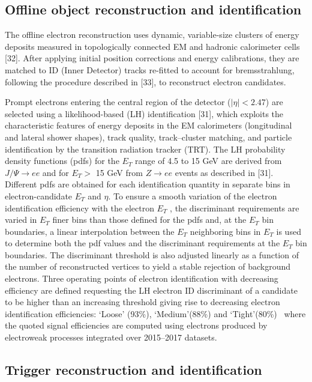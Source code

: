 \subsection{Offline object reconstruction and identification}\label{subsec:electron_offline}

The offline electron reconstruction uses dynamic, variable-size clusters of energy deposits measured in topologically connected EM and hadronic calorimeter cells [32]. After applying initial position corrections and energy calibrations, they are matched to ID (Inner Detector) tracks re-fitted to account for bremsstrahlung, following the procedure described in [33], to reconstruct electron candidates. 

Prompt electrons entering the central region of the detector ($|\eta|<2.47$) are selected using a likelihood-based (LH) identification [31], which exploits the characteristic features of energy deposits in the EM calorimeters (longitudinal and lateral shower shapes), track quality, track–cluster matching, and particle identification by the transition radiation tracker (TRT). The LH probability density functions (pdfs) for the $E_T$ range of 4.5 to 15 GeV are derived from $J/\Psi\rightarrow ee$ and for $E_T >$ 15 GeV from $Z\rightarrow ee$ events as described in [31]. Different pdfs are obtained for each identification quantity in separate bins in electron-candidate $E_T$ and $\eta$. To ensure a smooth variation of the electron identification efficiency with the electron $E_T$ , the discriminant requirements are varied in $E_T$ finer bins than those defined for the pdfs and, at the $E_T$ bin boundaries, a linear interpolation between the $E_T$ neighboring bins in $E_T$ is used to determine both the pdf values and the discriminant requirements at the $E_T$ bin boundaries. The discriminant threshold is also adjusted linearly as a function of the number of reconstructed vertices to yield a stable rejection of background electrons. Three operating points of electron identification with decreasing efficiency are defined requesting the LH electron ID discriminant of a candidate to be higher than an increasing threshold giving rise to decreasing electron identification efficiencies: ‘Loose’ (93\%), ‘Medium’(88\%) and ‘Tight’(80\%)~\cite{TRIG-2018-01} where the quoted signal efficiencies are computed using electrons produced by electroweak processes integrated over 2015–2017 datasets.

\subsection{Trigger reconstruction and identification}\label{subsec:electron_online}

